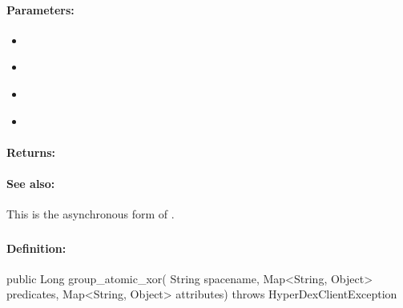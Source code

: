 \paragraph{Parameters:}
\begin{itemize}[noitemsep]
\item {}\\

\item {}\\

\item {}\\

\item {}\\

\end{itemize}

\paragraph{Returns:}


\paragraph{See also:}  This is the asynchronous form of .

\pagebreak
\subsubsection{}
\label{api:java:group_atomic_xor}


\paragraph{Definition:}
\begin{javacode}
public Long group_atomic_xor(
        String spacename,
        Map<String, Object> predicates,
        Map<String, Object> attributes) throws HyperDexClientException
\end{javacode}

